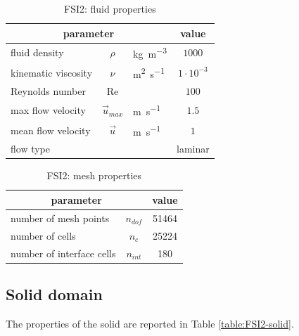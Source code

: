 \begin{table}[!htb]
	\begin{center}
		\begin{tabular}{ l c l | c } 
			\multicolumn{3}{c|}{parameter} & value  \\ 
			\hline
			fluid density  & $\rho$ & \si{kg.m^{-3}} & $1000$   \\
			kinematic viscosity & $\nu$& \si{m^{2}.s^{-1}} & $1 \cdot 10^{-3}$  \\
			Reynolds number & Re &  & $100$ \\
			max flow velocity & $\vec{u}_{max}$ & \si{m.s^{-1}} & $1.5$ \\
			mean flow velocity & $\vec{u}$ & \si{m.s^{-1}} & $1$ \\
			flow type & & & laminar \\
		\end{tabular}
	\end{center}
	\caption{FSI2: fluid properties}
	\label{table:FSI2-fluid}
\end{table}



\begin{table}[!htb]
	\begin{center}
		\begin{tabular}{ l c | c } 
			\multicolumn{2}{c|}{parameter} & value   \\ 
			\hline
			number of mesh points  & $n_{dof}$ & 51464     \\
			number of cells & $n_c$ & 25224  \\
			number of interface cells  & $n_{int}$ & 180  \\			
		\end{tabular}
	\end{center}
	\caption{FSI2: mesh properties}
	\label{table:FSI2-mesh}
\end{table}


\subsection{Solid domain}

The properties of the solid are reported in Table \ref{table:FSI2-solid}.

